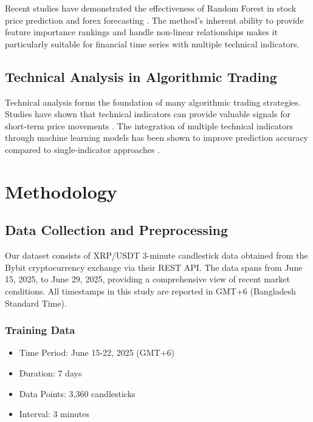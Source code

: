 \documentclass[11pt,a4paper]{article}
\begin{document}
Recent studies have demonstrated the effectiveness of Random Forest in stock price prediction \cite{khaidem2016predicting} and forex forecasting \cite{galeshchuk2016neural}. The method's inherent ability to provide feature importance rankings and handle non-linear relationships makes it particularly suitable for financial time series with multiple technical indicators.

\subsection{Technical Analysis in Algorithmic Trading}

Technical analysis forms the foundation of many algorithmic trading strategies. Studies have shown that technical indicators can provide valuable signals for short-term price movements \cite{brock1992simple}. The integration of multiple technical indicators through machine learning models has been shown to improve prediction accuracy compared to single-indicator approaches \cite{patel2015predicting}.

\section{Methodology}

\subsection{Data Collection and Preprocessing}

Our dataset consists of XRP/USDT 3-minute candlestick data obtained from the Bybit cryptocurrency exchange via their REST API. The data spans from June 15, 2025, to June 29, 2025, providing a comprehensive view of recent market conditions. All timestamps in this study are reported in GMT+6 (Bangladesh Standard Time).

\subsubsection{Training Data}
\begin{itemize}
    \item Time Period: June 15-22, 2025 (GMT+6)
    \item Duration: 7 days
    \item Data Points: 3,360 candlesticks
    \item Interval: 3 minutes
\end{itemize}
\end{document}
